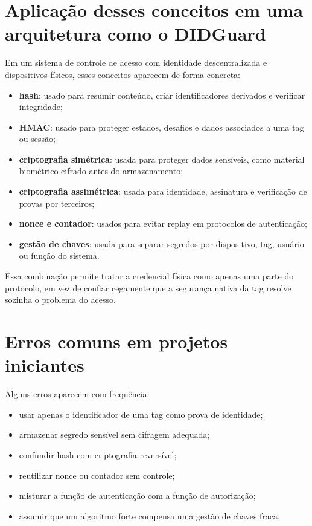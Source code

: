 \section{Aplicação desses conceitos em uma arquitetura como o DIDGuard}
Em um sistema de controle de acesso com identidade descentralizada e dispositivos físicos, esses conceitos aparecem de forma concreta:
\begin{itemize}[leftmargin=*]
  \item \textbf{hash}: usado para resumir conteúdo, criar identificadores derivados e verificar integridade;
  \item \textbf{HMAC}: usado para proteger estados, desafios e dados associados a uma tag ou sessão;
  \item \textbf{criptografia simétrica}: usada para proteger dados sensíveis, como material biométrico cifrado antes do armazenamento;
  \item \textbf{criptografia assimétrica}: usada para identidade, assinatura e verificação de provas por terceiros;
  \item \textbf{nonce e contador}: usados para evitar replay em protocolos de autenticação;
  \item \textbf{gestão de chaves}: usada para separar segredos por dispositivo, tag, usuário ou função do sistema.
\end{itemize}

Essa combinação permite tratar a credencial física como apenas uma parte do protocolo, em vez de confiar cegamente que a segurança nativa da tag resolve sozinha o problema do acesso.

\section{Erros comuns em projetos iniciantes}
Alguns erros aparecem com frequência:
\begin{itemize}[leftmargin=*]
  \item usar apenas o identificador de uma tag como prova de identidade;
  \item armazenar segredo sensível sem cifragem adequada;
  \item confundir hash com criptografia reversível;
  \item reutilizar nonce ou contador sem controle;
  \item misturar a função de autenticação com a função de autorização;
  \item assumir que um algoritmo forte compensa uma gestão de chaves fraca.
\end{itemize}

